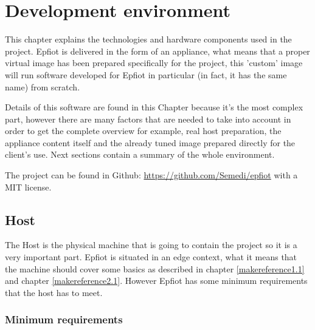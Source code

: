 
\cleardoublepage


\chapter{Development environment}
\label{makereference3}

This chapter explains the technologies and hardware components used in the project. Epfiot is delivered in the form of an appliance, what means that a proper virtual image  has been prepared specifically for the project, this 'custom' image will run software developed for Epfiot in particular (in fact, it has the same name) from scratch.

Details of this software are found in this Chapter because it's the most complex part, however there are many factors that are needed to take into account in order to get the complete overview for example, real host preparation, the appliance content itself and the already tuned image prepared directly for the client's use. Next sections contain a summary of the whole environment.

The project can be found in Github: \url{https://github.com/Semedi/epfiot} with a MIT license.


\section{Host}
\label{makereference3.1}

The Host is the physical machine that is going to contain the project so it is a very important part. Epfiot is situated in an edge context, what it means that the machine should cover some basics as described in chapter \ref{makereference1.1} and chapter \ref{makereference2.1}. However Epfiot has some minimum requirements that the host has to meet.

\newpage
\subsection{Minimum requirements}
\label{makereference3.1.1}

